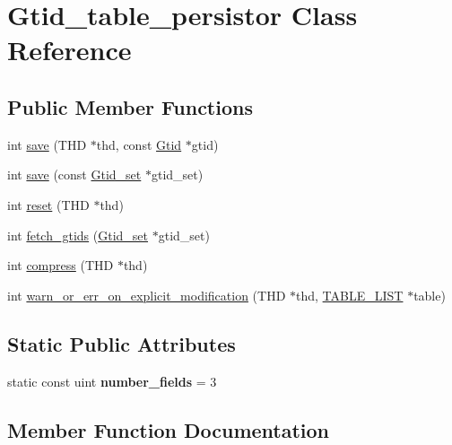 \hypertarget{classGtid__table__persistor}{}\section{Gtid\+\_\+table\+\_\+persistor Class Reference}
\label{classGtid__table__persistor}
\subsection*{Public Member Functions}
\begin{DoxyCompactItemize}
\item 
int \mbox{\hyperlink{classGtid__table__persistor_a08e26d72ec9a37222b9aa3f73e90c22e}{save}} (T\+HD $\ast$thd, const \mbox{\hyperlink{structGtid}{Gtid}} $\ast$gtid)
\item 
int \mbox{\hyperlink{classGtid__table__persistor_adc93f28a3661201e896d7102a57a01ca}{save}} (const \mbox{\hyperlink{classGtid__set}{Gtid\+\_\+set}} $\ast$gtid\+\_\+set)
\item 
int \mbox{\hyperlink{classGtid__table__persistor_a97d9a48c80bb5b50640439be409aea62}{reset}} (T\+HD $\ast$thd)
\item 
int \mbox{\hyperlink{classGtid__table__persistor_aeea3284db6daf718fa412a70e4afb889}{fetch\+\_\+gtids}} (\mbox{\hyperlink{classGtid__set}{Gtid\+\_\+set}} $\ast$gtid\+\_\+set)
\item 
int \mbox{\hyperlink{classGtid__table__persistor_a6707d588aba706f2d7560ff811072410}{compress}} (T\+HD $\ast$thd)
\item 
int \mbox{\hyperlink{classGtid__table__persistor_a422095100e846e98c02436f152f0a6df}{warn\+\_\+or\+\_\+err\+\_\+on\+\_\+explicit\+\_\+modification}} (T\+HD $\ast$thd, \mbox{\hyperlink{structTABLE__LIST}{T\+A\+B\+L\+E\+\_\+\+L\+I\+ST}} $\ast$table)
\end{DoxyCompactItemize}
\subsection*{Static Public Attributes}
\begin{DoxyCompactItemize}
\item 
\mbox{\label{classGtid__table__persistor_a616c2907892f706a95455f74e752e781}} 
static const uint {\bfseries number\+\_\+fields} = 3
\end{DoxyCompactItemize}


\subsection{Member Function Documentation}
\mbox{\label{classGtid__table__persistor_a6707d588aba706f2d7560ff811072410}} 
